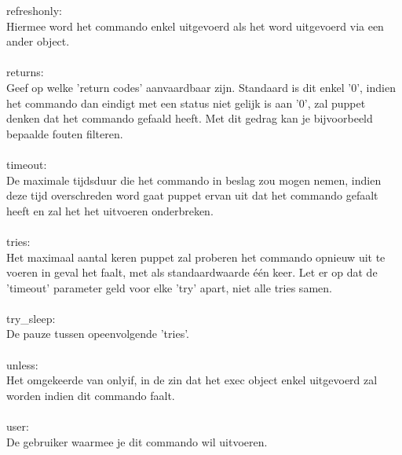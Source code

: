 %
refreshonly:\\
Hiermee word het commando enkel uitgevoerd als het word uitgevoerd via een ander object.\\\\
%
returns:\\
Geef op welke 'return codes' aanvaardbaar zijn. Standaard is dit enkel '0', indien het commando dan eindigt met een status niet gelijk is aan '0', zal puppet denken dat het commando gefaald heeft. Met dit gedrag kan je bijvoorbeeld bepaalde fouten filteren.\\\\
%
timeout:\\
De maximale tijdsduur die het commando in beslag zou mogen nemen, indien deze tijd overschreden word gaat puppet ervan uit dat het commando gefaalt heeft en zal het het uitvoeren onderbreken.\\\\
%
tries:\\
Het maximaal aantal keren puppet zal proberen het commando opnieuw uit te voeren in geval het faalt, met als standaardwaarde \'e\'en keer. Let er op dat de 'timeout' parameter geld voor elke 'try' apart, niet alle tries samen.\\\\
%
try\_sleep:\\
De pauze tussen opeenvolgende 'tries'.\\\\
%
unless:\\
Het omgekeerde van onlyif, in de zin dat het exec object enkel uitgevoerd zal worden indien dit commando faalt.\\\\
%
user:\\
De gebruiker waarmee je dit commando wil uitvoeren.\\\\

